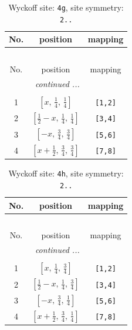 \documentclass[fleqn,8pt]{jsarticle}
\begin{document}
\renewcommand{\arraystretch}{1.2}
\begin{longtable}{ccc}
\caption{Wyckoff site: {\tt 4g}, site symmetry: {\tt 2..}}
 \\
 \hline \hline
No. & position & mapping \\ \hline \endfirsthead

\multicolumn{2}{l}{\tablename\ \thetable{}} \\
 \hline \hline
No. & position & mapping \\ \hline \endhead

 \hline \hline
\multicolumn{2}{r}{\footnotesize\it continued ...} \\ \endfoot

 \hline \hline
\multicolumn{2}{r}{} \\ \endlastfoot

1 & $\left[ x,\, \frac{1}{4},\, \frac{1}{4} \right]$ & {\tt [1,2]} \\ \hline
2 & $\left[ \frac{1}{2} - x,\, \frac{1}{4},\, \frac{1}{4} \right]$ & {\tt [3,4]} \\ \hline
3 & $\left[ - x,\, \frac{3}{4},\, \frac{3}{4} \right]$ & {\tt [5,6]} \\ \hline
4 & $\left[ x + \frac{1}{2},\, \frac{3}{4},\, \frac{3}{4} \right]$ & {\tt [7,8]} \\
\end{longtable}
\renewcommand{\arraystretch}{1.2}
\begin{longtable}{ccc}
\caption{Wyckoff site: {\tt 4h}, site symmetry: {\tt 2..}}
 \\
 \hline \hline
No. & position & mapping \\ \hline \endfirsthead

\multicolumn{2}{l}{\tablename\ \thetable{}} \\
 \hline \hline
No. & position & mapping \\ \hline \endhead

 \hline \hline
\multicolumn{2}{r}{\footnotesize\it continued ...} \\ \endfoot

 \hline \hline
\multicolumn{2}{r}{} \\ \endlastfoot

1 & $\left[ x,\, \frac{1}{4},\, \frac{3}{4} \right]$ & {\tt [1,2]} \\ \hline
2 & $\left[ \frac{1}{2} - x,\, \frac{1}{4},\, \frac{3}{4} \right]$ & {\tt [3,4]} \\ \hline
3 & $\left[ - x,\, \frac{3}{4},\, \frac{1}{4} \right]$ & {\tt [5,6]} \\ \hline
4 & $\left[ x + \frac{1}{2},\, \frac{3}{4},\, \frac{1}{4} \right]$ & {\tt [7,8]} \\
\end{longtable}
\end{document}
